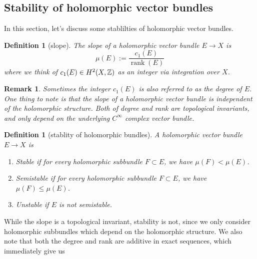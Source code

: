 \documentclass[11pt]{amsart}
\numberwithin{equation}{section}
\theoremstyle{plain}
\theoremstyle{plain}
\newtheorem{defnsub}[thmsub]{Definition}
\newtheorem{remksub}[thmsub]{Remark}
\numberwithin{equation}{section}
\begin{document}
\subsection{Stability of holomorphic vector bundles}
In this section, let's discuss some stablilties of holomorphic vector bundles.
\begin{defnsub}[slope]
The slope of a holomorphic vector bundle $E\to X$ is 
$$
\mu(E):=\frac{c_1(E)}{\operatorname{rank}(E)}
$$
where we think of $c_1(E)\in H^2(X,\Bbb{Z})$ as an integer via integration over $X$.
\end{defnsub}
\begin{remksub}\normalfont
Sometimes the integer $c_1(E)$ is also referred to as the degree of $E$. One thing to note is that the slope of a holomorphic vector bundle is independent of the holomorphic structure. Both of degree and rank are topological invariants, and only depend on the underlying $C^{\infty}$ complex vector bundle.
\end{remksub}

\begin{defnsub}[stablity of holomorphic bundles]
A holomorphic vector bundle $E\to X$ is 
\begin{enumerate}[$1.$]
\item Stable if for every holomorphic subbundle $F\subset E$, we have $\mu(F)<\mu(E)$.
\item Semistable if for every holomorphic subbundle $F\subset E$, we have $\mu(F)\leq \mu(E)$.
\item Unstable if $E$ is not semistable.
\end{enumerate}
\end{defnsub}

While the slope is a topological invariant, stability is not, since we only consider holomorphic subbundles which depend on the holomorphic structure. We also note that both the degree and rank are additive in exact sequences, which immediately give us 
\end{document}
